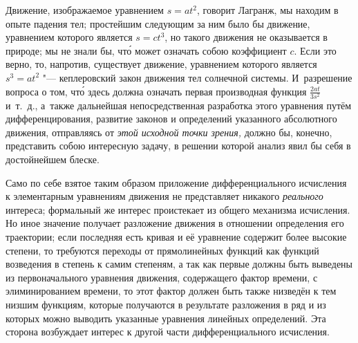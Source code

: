 Движение, изображаемое уравнением $s=at^2$, говорит Лагранж, мы находим в опыте
падения тел; простейшим следующим за ним было бы движение, уравнением которого
является $s=ct^3$, но такого движения не оказывается в природе; мы не знали бы,
чт\'{о} может означать собою коэффициент $c$. Если это верно, то, напротив,
существует движение, уравнением которого является $s^3=at^2$ "--- кеплеровский
закон движения тел солнечной системы. И~разрешение вопроса о том, чт\'{о} здесь
должна означать первая производная функция $\frac{2at}{3s^2}$ и~т.~д., а~также
дальнейшая непосредственная разработка этого уравнения путём дифференцирования,
развитие законов и определений указанного абсолютного движения, отправляясь от
{\em этой исходной точки зрения,} должно бы, конечно, представить собою
интересную задачу, в решении которой анализ явил бы себя в достойнейшем блеске.

Само по себе взятое таким образом приложение дифференциального исчисления
к элементарным уравнениям движения не представляет никакого {\em реального} интереса;
формальный же интерес проистекает из общего механизма исчисления. Но иное
значение получает разложение движения в отношении определения его траектории;
если последняя есть кривая и её уравнение содержит более высокие степени, то требуются
переходы от прямолинейных функций как функций возведения в степень к самим степеням, а так
как первые должны быть выведены из первоначального уравнения движения,
содержащего фактор времени, с элиминированием времени, то этот фактор
должен быть также низведён к тем низшим функциям, которые получаются
в результате разложения в ряд и из которых
можно выводить указанные уравнения линейных определений. Эта сторона
возбуждает интерес к другой части дифференциального исчисления.

